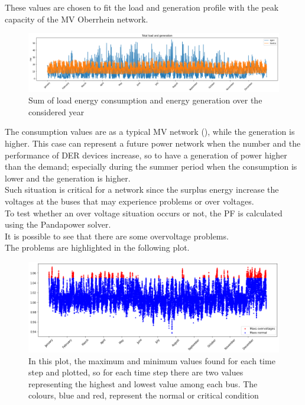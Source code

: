 These values are chosen to fit the load and generation profile with the peak capacity of the MV Oberrhein network.

\begin{figure}[H]
\centering
    \includegraphics[width=.9\linewidth]{images/MVOberr/Load&Gens.png}
\caption{Sum of load energy consumption and energy generation over the considered year}
\label{fig:gym_anm_net}
\end{figure}

The consumption values are as a typical MV network (\cite{MVnetworks}), while the generation is higher. This case can represent a future power network when the number and the performance of \gls{DER} devices increase, so to have a generation of power higher than the demand; especially during the summer period when the consumption is lower and the generation is higher.\\
Such situation is critical for a network since the surplus energy increase the voltages at the buses that may experience problems or over voltages. \\


To test whether an over voltage situation occurs or not, the \gls{PF} is calculated using the Pandapower solver.\\
It is possible to see that there are some overvoltage problems. \\
The problems are highlighted in the following plot.

\begin{figure}[H]
\centering
    \includegraphics[width=.8\linewidth]{images/MVOberr/CriticalSituation.png}
\caption{In this plot, the maximum and minimum values found for each time step and plotted, so for each time step there are two values representing the highest and lowest value among each bus. The colours, blue and red, represent the normal or critical condition}

 \end{figure}


